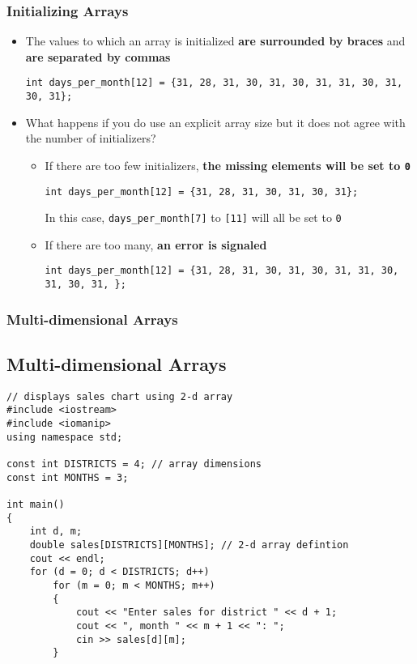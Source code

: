 \documentclass{beamer}
\begin{document}
\begin{frame}\frametitle{Initializing Arrays}
    \begin{itemize}
        \item The values to which an array is initialized \textbf{are surrounded by braces} and \textbf{are separated by commas}
        \begin{center}
            \texttt{int days\_per\_month[12] = \{31, 28, 31, 30, 31, 30, 31, 31, 30, 31, 30, 31\};}
        \end{center}
        \item What happens if you do use an explicit array size but it does not agree with the number of initializers?
        \begin{itemize}
            \item If there are too few initializers, \textbf{the missing elements will be set to \texttt{0}}
            \begin{center}
                \texttt{int days\_per\_month[12] = \{31, 28, 31, 30, 31, 30, 31\};}
            \end{center}
            In this case, \texttt{days\_per\_month[7]} to \texttt{[11]} will all be set to \texttt{0}
            \item If there are too many, \textbf{an error is signaled}
            \begin{center}
                \texttt{int days\_per\_month[12] = \{31, 28, 31, 30, 31, 30, 31, 31, 30, 31, 30, 31, {\color{red}{30, 31, 30, 31}}\};}
            \end{center}
        \end{itemize}
    \end{itemize}
\end{frame}

\begin{frame}[fragile]\frametitle{Multi-dimensional Arrays}
    \subsection{Multi-dimensional Arrays} %
    \label{sub:multi_dimensional_arrays}
    \lstset{style=mystyle}
\begin{lstlisting}
// displays sales chart using 2-d array
#include <iostream>
#include <iomanip>
using namespace std;

const int DISTRICTS = 4; // array dimensions
const int MONTHS = 3;

int main()
{
    int d, m;
    double sales[DISTRICTS][MONTHS]; // 2-d array defintion
    cout << endl;
    for (d = 0; d < DISTRICTS; d++)
        for (m = 0; m < MONTHS; m++)
        {
            cout << "Enter sales for district " << d + 1;
            cout << ", month " << m + 1 << ": ";
            cin >> sales[d][m];
        }
\end{lstlisting}
\end{frame}
\end{document}
